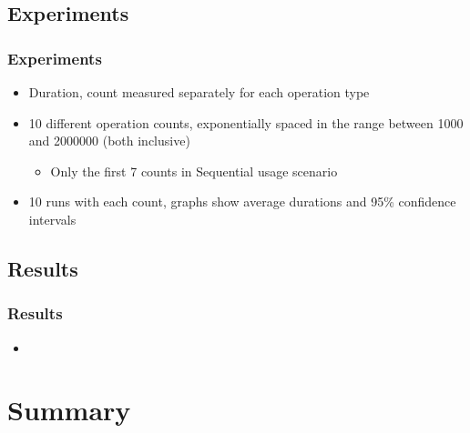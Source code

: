 \documentclass{beamer}
\begin{document}
\subsection{Experiments}


\begin{frame}
\frametitle{Experiments}
\begin{itemize}

  \item Duration, count measured separately for each operation type

  \item 10 different operation counts, exponentially spaced in the range between
  1000 and 2000000 (both inclusive)
  
  \begin{itemize}
    \item Only the first 7 counts in Sequential usage scenario
  \end{itemize}

  \item 10 runs with each count, graphs show average durations and 95\%
  confidence intervals

\end{itemize}
\end{frame}

\subsection{Results}
\begin{frame}
\frametitle{Results}
\begin{itemize}
  \item 
\end{itemize}
\end{frame}


\section*{Summary}
\end{document}

